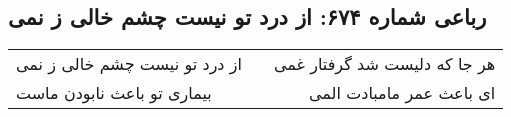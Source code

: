 \begin{center}
\section*{رباعی شماره ۶۷۴: از درد تو نیست چشم خالی ز نمی}
\label{sec:sh674}
\begin{longtable}{l p{0.5cm} r}
از درد تو نیست چشم خالی ز نمی
&&
هر جا که دلیست شد گرفتار غمی
\\
بیماری تو باعث نابودن ماست
&&
ای باعث عمر مامبادت المی
\\
\end{longtable}
\end{center}
